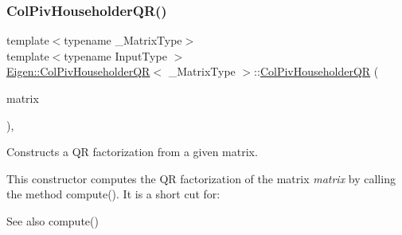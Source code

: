 \subsubsection{\texorpdfstring{ColPivHouseholderQR()}{ColPivHouseholderQR()}\hspace{0.1cm}{\footnotesize\ttfamily [3/4]}}
{\footnotesize\ttfamily template$<$typename \+\_\+\+Matrix\+Type$>$ \\
template$<$typename Input\+Type $>$ \\
\mbox{\hyperlink{class_eigen_1_1_col_piv_householder_q_r}{Eigen\+::\+Col\+Piv\+Householder\+QR}}$<$ \+\_\+\+Matrix\+Type $>$\+::\mbox{\hyperlink{class_eigen_1_1_col_piv_householder_q_r}{Col\+Piv\+Householder\+QR}} (\begin{DoxyParamCaption}\item[{const \mbox{\hyperlink{struct_eigen_1_1_eigen_base}{Eigen\+Base}}$<$ Input\+Type $>$ \&}]{matrix }\end{DoxyParamCaption})\hspace{0.3cm}{\ttfamily [inline]}, {\ttfamily [explicit]}}



Constructs a QR factorization from a given matrix. 

This constructor computes the QR factorization of the matrix {\itshape matrix} by calling the method compute(). It is a short cut for\+:


\begin{DoxyCode}{0}
\end{DoxyCode}


\begin{DoxySeeAlso}{See also}
compute() 
\end{DoxySeeAlso}
\mbox{\label{class_eigen_1_1_col_piv_householder_q_r_a65782010a93a4c9ef4a9191ac8fe30bc}} 
